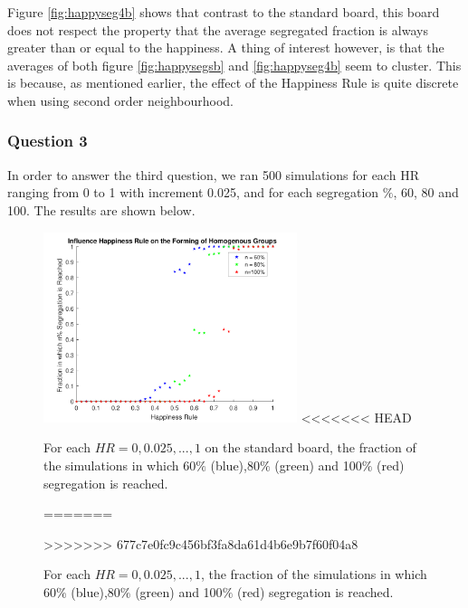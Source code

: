 Figure \ref{fig:happyseg4b} shows that contrast to the standard board, this board does not respect the property that the average segregated fraction is always greater than or equal to the happiness. 
A thing of interest however, is that the averages of both figure \ref{fig:happysegsb} and \ref{fig:happyseg4b} seem to cluster. 
This is because, as mentioned earlier, the effect of the Happiness Rule is quite discrete when using second order neighbourhood.

\subsubsection{Question 3}
In order to answer the third question, we ran 500 simulations for each HR ranging from 0 to 1 with increment 0.025, and for each segregation $\%$, 60, 80 and 100. 
The results are shown below.
\begin{figure}[H]
    \centering
    \includegraphics[width=280px]{happy_segr_60_80_100.pdf}
<<<<<<< HEAD
    \caption{For each $HR = 0,0.025,...,1$ on the standard board, the fraction of the simulations in which 60$\%$ (blue),80$\%$ (green) and 100$\%$ (red) segregation is reached.}
    \label{fig:happysegfrac}
=======
    \caption{For each $HR = 0,0.025,...,1$, the fraction of the simulations in which 60$\%$ (blue),80$\%$ (green) and 100$\%$ (red) segregation is reached.}
    \label{fig:happyseg4c}
>>>>>>> 677c7e0fc9c456bf3fa8da61d4b6e9b7f60f04a8
\end{figure}

